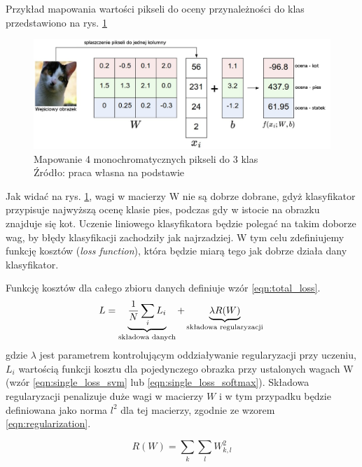 Przykład mapowania wartości pikseli do oceny przynależności do klas przedstawiono na rys. \ref{fig:lin_class}
\begin{figure}[h!tb]
	 \centering
	 \includegraphics[width = 1.0\linewidth]{img/lin_klas}
	 \caption{Mapowanie 4 monochromatycznych pikseli do 3 klas \\
              Źródło: praca własna na podstawie \cite{cs231n}}
	 \label{fig:lin_class}
\end{figure}

Jak widać na rys. \ref{fig:lin_class}, wagi w macierzy W nie są dobrze dobrane, gdyż klasyfikator przypisuje najwyższą ocenę klasie pies, podczas gdy w istocie na obrazku znajduje się kot.
Uczenie liniowego klasyfikatora będzie polegać na takim doborze wag, by błędy klasyfikacji zachodziły jak najrzadziej.
W tym celu zdefiniujemy funkcję kosztów (\textit{loss function}), która będzie miarą tego jak dobrze działa dany klasyfikator.\cite{cs231n}

Funkcję kosztów dla całego zbioru danych definiuje wzór \ref{eqn:total_loss}.
\begin{equation}\label{eqn:total_loss}
L =  \underbrace{ \frac{1}{N} \sum_i L_i }_\text{składowa danych} + \underbrace{ \lambda R(W) }_\text{składowa regularyzacji} \\\\
\end{equation}
gdzie $\lambda$ jest parametrem kontrolującym oddziaływanie regularyzacji przy uczeniu, $L_i$ wartością funkcji kosztu dla pojedynczego obrazka przy ustalonych wagach W (wzór \ref{eqn:single_loss_svm} lub \ref{eqn:single_loss_softmax}).
Składowa regularyzacji penalizuje duże wagi w macierzy $W$ i w tym przypadku będzie definiowana jako norma $l^2$ dla tej macierzy, zgodnie ze wzorem \ref{eqn:regularization}.

\begin{equation}\label{eqn:regularization}
R(W) = \sum_k\sum_l W_{k,l}^2
\end{equation}

